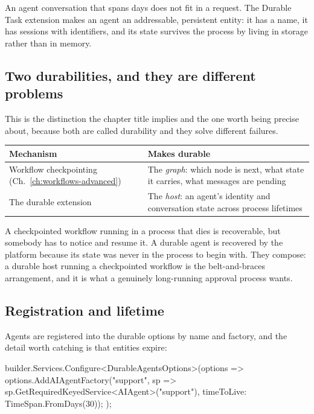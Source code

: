 An agent conversation that spans days does not fit in a request. The Durable Task
extension makes an agent an addressable, persistent entity: it has a name, it has
sessions with identifiers, and its state survives the process by living in
storage rather than in memory.

\subsection{Two durabilities, and they are different problems}

This is the distinction the chapter title implies and the one worth being precise
about, because both are called durability and they solve different failures.

\begin{center}
\small
\begin{tabularx}{\linewidth}{@{}lX@{}}
\toprule
\textbf{Mechanism} & \textbf{Makes durable} \\
\midrule
Workflow checkpointing (Ch.~\ref{ch:workflows-advanced}) & The \emph{graph}: which
node is next, what state it carries, what messages are pending \\[4pt]
The durable extension & The \emph{host}: an agent's identity and conversation
state across process lifetimes \\
\bottomrule
\end{tabularx}
\end{center}

\noindent
A checkpointed workflow running in a process that dies is recoverable, but
somebody has to notice and resume it. A durable agent is recovered by the
platform because its state was never in the process to begin with. They compose:
a durable host running a checkpointed workflow is the belt-and-braces
arrangement, and it is what a genuinely long-running approval process wants.

\subsection{Registration and lifetime}

Agents are registered into the durable options by name and factory, and the
detail worth catching is that entities expire:

\begin{csharp}[caption={A durable agent}, label={lst:host-durable}]
builder.Services.Configure<DurableAgentsOptions>(options =>
{
    options.AddAIAgentFactory("support",
        sp => sp.GetRequiredKeyedService<AIAgent>("support"),
        timeToLive: TimeSpan.FromDays(30));
});
\end{csharp}

